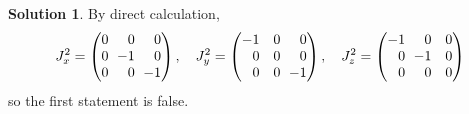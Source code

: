 \documentclass[11pt, a4paper]{report}
\theoremstyle{definition}
\newtheorem{solution}{Solution}[part]
\newenvironment{sol}{\begin{solution}}{\end{solution}\pagebreak[3]}
\newcommand*{\m}{\ensuremath\:\, \mathllap{-}}
\begin{document}
\begin{sol}

By direct calculation,
\[
    J_x^2 = \begin{pmatrix*}[r]
            0 &    0 & 0 \\
            0 & \m 1 & 0 \\
            0 &    0 & \m 1
        \end{pmatrix*}, \quad
    J_y^2 = \begin{pmatrix*}[r]
            -1 & 0 & 0 \\
             0 & 0 & 0 \\
             0 & 0 & \m 1
        \end{pmatrix*}, \quad
    J_z^2 = \begin{pmatrix*}[r]
            -1 &    0 & 0 \\
             0 & \m 1 & 0 \\
             0 &    0 & 0
        \end{pmatrix*}
\]
so the first statement is false.


\end{sol}
\end{document}
